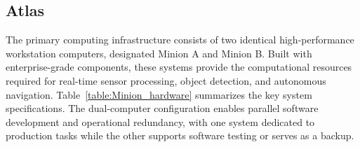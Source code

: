 \documentclass{erauthesis}
\begin{document}




\subsection{Atlas} \label{atlas}

The primary computing infrastructure consists of two identical high-performance workstation computers, designated Minion A and Minion B.  
Built with enterprise-grade components, these systems provide the computational resources required for real-time sensor processing, object detection, and autonomous navigation.
Table~\ref{table:Minion_hardware} summarizes the key system specifications.
The dual-computer configuration enables parallel software development and operational redundancy, with one system dedicated to production tasks while the other supports software testing or serves as a backup.
 

\end{document}
